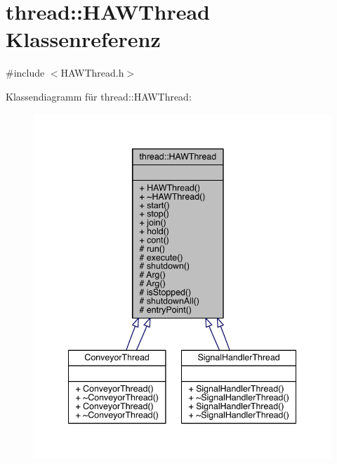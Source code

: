 \hypertarget{classthread_1_1_h_a_w_thread}{}\section{thread\+:\+:H\+A\+W\+Thread Klassenreferenz}
\label{classthread_1_1_h_a_w_thread}


{\ttfamily \#include $<$H\+A\+W\+Thread.\+h$>$}



Klassendiagramm für thread\+:\+:H\+A\+W\+Thread\+:
\nopagebreak
\begin{figure}[H]
\begin{center}
\leavevmode
\includegraphics[width=342pt]{classthread_1_1_h_a_w_thread__inherit__graph}
\end{center}
\end{figure}


